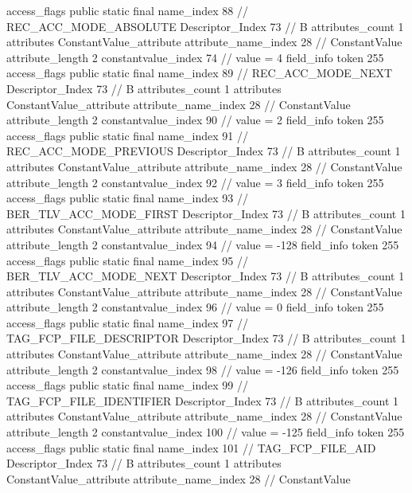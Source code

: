 {{{{{				access_flags	public static final
				name_index	88		// REC_ACC_MODE_ABSOLUTE
				Descriptor_Index	73		// B
				attributes_count	1
				attributes {
				ConstantValue_attribute {
					attribute_name_index	28		// ConstantValue
					attribute_length	2
					constantvalue_index	74		// value = 4
				}
				}
			}
			field_info {
				token	255
				access_flags	public static final
				name_index	89		// REC_ACC_MODE_NEXT
				Descriptor_Index	73		// B
				attributes_count	1
				attributes {
				ConstantValue_attribute {
					attribute_name_index	28		// ConstantValue
					attribute_length	2
					constantvalue_index	90		// value = 2
				}
				}
			}
			field_info {
				token	255
				access_flags	public static final
				name_index	91		// REC_ACC_MODE_PREVIOUS
				Descriptor_Index	73		// B
				attributes_count	1
				attributes {
				ConstantValue_attribute {
					attribute_name_index	28		// ConstantValue
					attribute_length	2
					constantvalue_index	92		// value = 3
				}
				}
			}
			field_info {
				token	255
				access_flags	public static final
				name_index	93		// BER_TLV_ACC_MODE_FIRST
				Descriptor_Index	73		// B
				attributes_count	1
				attributes {
				ConstantValue_attribute {
					attribute_name_index	28		// ConstantValue
					attribute_length	2
					constantvalue_index	94		// value = -128
				}
				}
			}
			field_info {
				token	255
				access_flags	public static final
				name_index	95		// BER_TLV_ACC_MODE_NEXT
				Descriptor_Index	73		// B
				attributes_count	1
				attributes {
				ConstantValue_attribute {
					attribute_name_index	28		// ConstantValue
					attribute_length	2
					constantvalue_index	96		// value = 0
				}
				}
			}
			field_info {
				token	255
				access_flags	public static final
				name_index	97		// TAG_FCP_FILE_DESCRIPTOR
				Descriptor_Index	73		// B
				attributes_count	1
				attributes {
				ConstantValue_attribute {
					attribute_name_index	28		// ConstantValue
					attribute_length	2
					constantvalue_index	98		// value = -126
				}
				}
			}
			field_info {
				token	255
				access_flags	public static final
				name_index	99		// TAG_FCP_FILE_IDENTIFIER
				Descriptor_Index	73		// B
				attributes_count	1
				attributes {
				ConstantValue_attribute {
					attribute_name_index	28		// ConstantValue
					attribute_length	2
					constantvalue_index	100		// value = -125
				}
				}
			}
			field_info {
				token	255
				access_flags	public static final
				name_index	101		// TAG_FCP_FILE_AID
				Descriptor_Index	73		// B
				attributes_count	1
				attributes {
				ConstantValue_attribute {
					attribute_name_index	28		// ConstantValue
}}}}}}}
